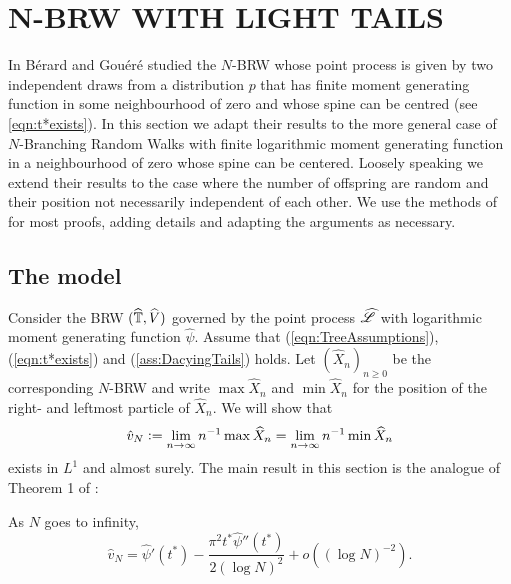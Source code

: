 \section{N-BRW WITH LIGHT TAILS}\label{sec:light_tails}

In \cite{exp_tails} Bérard and Gouéré studied the $N$-BRW whose point process is given by two independent draws from a distribution $p$ that has finite moment generating function in some neighbourhood of zero and whose spine can be centred (see \ref{eqn:t*exists}). In this section we adapt their results to the more general case of $N$-Branching Random Walks with finite logarithmic moment generating function in a neighbourhood of zero whose spine can be centered. Loosely speaking we extend their results to the case where the number of offspring are random and their position not necessarily independent of each other. We use the methods of \cite{exp_tails} for most proofs, adding details and adapting the arguments as necessary. 

\subsection{The model}\label{subsec:The_model}
Consider the BRW $(\widehat{\mathbb{T}}, \widehat{V})$ governed by the point process $\widehat{\mathscr{L}}$ with logarithmic moment generating function $\widehat{\psi}$. Assume that (\ref{eqn:TreeAssumptions}), (\ref{eqn:t*exists}) and (\ref{ass:DacyingTails}) holds. Let $(\widehat{X}_n)_{n \geq 0}$ be the corresponding $N$-BRW and write $\max \widehat{X}_n$ and $\min \widehat{X}_n$ for the position of the right- and leftmost particle of $\widehat{X}_n$. We will show that 
\begin{equation}\nonumber
\hat{v}_N \vcentcolon= \lim_{n \to \infty} n^{-1}\max\widehat{X}_n = \lim_{n \to \infty} n^{-1}\min\widehat{X}_n
\end{equation} 
exists in $L^1$ and almost surely. The main result in this section is the analogue of Theorem 1 of \cite{exp_tails}: 
\begin{theorem}\label{thm:ExpTails_BrunDer_non_transformed}
As $N$ goes to infinity, 
\begin{equation}\nonumber
\widehat{v}_N = \widehat{\psi}'(t^*) - \frac{\pi^2 t^* \widehat{\psi}''(t^*)}{2 (\log N)^2} + o((\log N)^{-2}). 
\end{equation}
\end{theorem}




